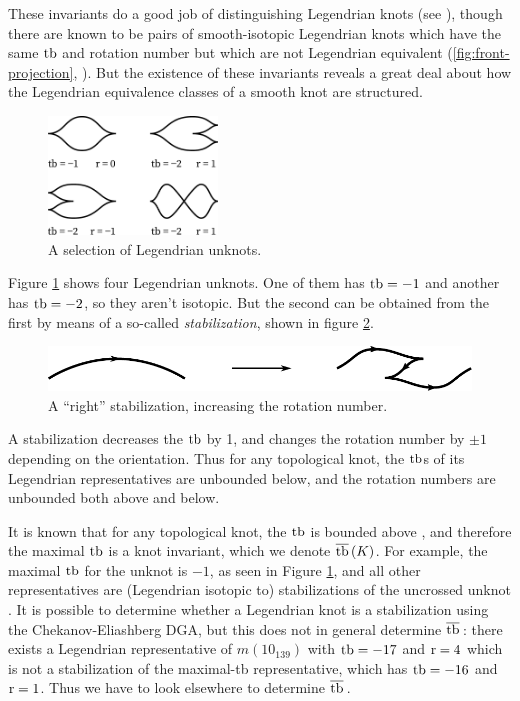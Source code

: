 These invariants do a good job of distinguishing Legendrian knots (see \cite{eliashberg2008unknot}), though there are known to be pairs of smooth-isotopic Legendrian knots which have the same $\operatorname{tb}$ and rotation number but which are not Legendrian equivalent (\ref{fig:front-projection}, \cite{chekanov}). But the existence of these invariants reveals a great deal about how the Legendrian equivalence classes of a smooth knot are structured. 

\begin{figure}[ht]
    \centering
    \includegraphics[width=0.4\textwidth]{images/unknots.pdf}
    \caption{A selection of Legendrian unknots.}%
    \label{fig:unknots}
\end{figure}

Figure \ref{fig:unknots} shows four Legendrian unknots. One of them has $\operatorname{tb} = -1$ and another has $\operatorname{tb} = -2$, so they aren't isotopic. But the second can be obtained from the first by means of a so-called \emph{stabilization}, shown in figure \ref{fig:stabilization}. 

\begin{figure}[ht]
    \centering
    \includegraphics[width=0.6\linewidth]{images/stabilization.pdf}
    \caption{A ``right'' stabilization, increasing the rotation number.}%
    \label{fig:stabilization}
\end{figure}

A stabilization decreases the $\operatorname{tb}$ by 1, and changes the rotation number by $\pm 1$ depending on the orientation. Thus for any topological knot, the $\operatorname{tb}$s of its Legendrian representatives are unbounded below, and the rotation numbers are unbounded both above and below.

It is known that for any topological knot, the $\operatorname{tb}$ is bounded above \cite{bennequin}, and therefore the maximal $\operatorname{tb}$ is a knot invariant, which we denote $\overline{\operatorname{tb}}\,(K)$.
For example, the maximal $\operatorname{tb}$ for the unknot is $-1$, as seen in Figure \ref{fig:unknots}, and all other representatives are (Legendrian isotopic to) stabilizations of the uncrossed unknot \cite{atlas}. It is possible to determine whether a Legendrian knot is a stabilization using the Chekanov-Eliashberg DGA, but this does not in general determine $\overline{\operatorname{tb}}\,$: there exists a Legendrian representative of $m(10_{139})$ with $\operatorname{tb} = -17$ and $\operatorname{r} = 4$ which is not a stabilization of the maximal-tb representative, which has $\operatorname{tb} = -16$ and $\operatorname{r} = 1$. Thus we have to look elsewhere to determine $\overline{\operatorname{tb}}\,$.

